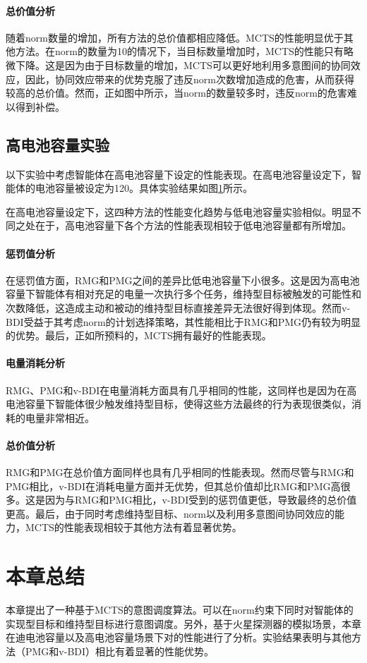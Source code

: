 \paragraph{总价值分析}
随着norm数量的增加，所有方法的总价值都相应降低。MCTS的性能明显优于其他方法。在norm的数量为10的情况下，当目标数量增加时，MCTS的性能只有略微下降。这是因为由于目标数量的增加，MCTS可以更好地利用多意图间的协同效应，因此，协同效应带来的优势克服了违反norm次数增加造成的危害，从而获得较高的总价值。然而，正如图中所示，当norm的数量较多时，违反norm的危害难以得到补偿。

\subsection{高电池容量实验}
以下实验中考虑智能体在高电池容量下设定的性能表现。在高电池容量设定下，智能体的电池容量被设定为120。具体实验结果如图\ref{}所示。

在高电池容量设定下，这四种方法的性能变化趋势与低电池容量实验相似。明显不同之处在于，高电池容量下各个方法的性能表现相较于低电池容量都有所增加。
\paragraph{惩罚值分析}
在惩罚值方面，RMG和PMG之间的差异比低电池容量下小很多。这是因为高电池容量下智能体有相对充足的电量一次执行多个任务，维持型目标被触发的可能性和次数降低，这造成主动和被动的维持型目标直接差异无法很好得到体现。然而v-BDI受益于其考虑norm的计划选择策略，其性能相比于RMG和PMG仍有较为明显的优势。最后，正如所预料的，MCTS拥有最好的性能表现。
\paragraph{电量消耗分析}
RMG、PMG和v-BDI在电量消耗方面具有几乎相同的性能，这同样也是因为在高电池容量下智能体很少触发维持型目标，使得这些方法最终的行为表现很类似，消耗的电量非常相近。
\paragraph{总价值分析}
RMG和PMG在总价值方面同样也具有几乎相同的性能表现。然而尽管与RMG和PMG相比，v-BDI在消耗电量方面并无优势，但其总价值却比RMG和PMG高很多。这是因为与RMG和PMG相比，v-BDI受到的惩罚值更低，导致最终的总价值更高。最后，由于同时考虑维持型目标、norm以及利用多意图间协同效应的能力，MCTS的性能表现相较于其他方法有着显著优势。

\section{本章总结}
本章提出了一种基于MCTS的意图调度算法\SAT 。\SAT 可以在norm约束下同时对智能体的实现型目标和维持型目标进行意图调度。另外，基于火星探测器的模拟场景，本章在迪电池容量以及高电池容量场景下对\SAT 的性能进行了分析。实验结果表明\SAT 与其他方法（PMG和v-BDI）相比有着显著的性能优势。
